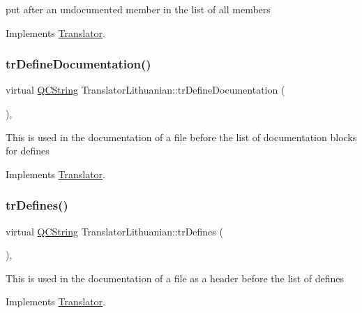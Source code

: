 put after an undocumented member in the list of all members 

Implements \mbox{\hyperlink{class_translator}{Translator}}.

\mbox{\label{class_translator_lithuanian_ae904d7373a81a4a7fb7c1f8f7c7632d7}} 
\subsubsection{\texorpdfstring{trDefineDocumentation()}{trDefineDocumentation()}}
{\footnotesize\ttfamily virtual \mbox{\hyperlink{class_q_c_string}{Q\+C\+String}} Translator\+Lithuanian\+::tr\+Define\+Documentation (\begin{DoxyParamCaption}{ }\end{DoxyParamCaption})\hspace{0.3cm}{\ttfamily [inline]}, {\ttfamily [virtual]}}

This is used in the documentation of a file before the list of documentation blocks for defines 

Implements \mbox{\hyperlink{class_translator}{Translator}}.

\mbox{\label{class_translator_lithuanian_ab8f8ccaa93aeb418b23c107a6ee9cccb}} 
\subsubsection{\texorpdfstring{trDefines()}{trDefines()}}
{\footnotesize\ttfamily virtual \mbox{\hyperlink{class_q_c_string}{Q\+C\+String}} Translator\+Lithuanian\+::tr\+Defines (\begin{DoxyParamCaption}{ }\end{DoxyParamCaption})\hspace{0.3cm}{\ttfamily [inline]}, {\ttfamily [virtual]}}

This is used in the documentation of a file as a header before the list of defines 

Implements \mbox{\hyperlink{class_translator}{Translator}}.

\mbox{\label{class_translator_lithuanian_af8c0ac0eabb17505079a80593466a4dd}} 
